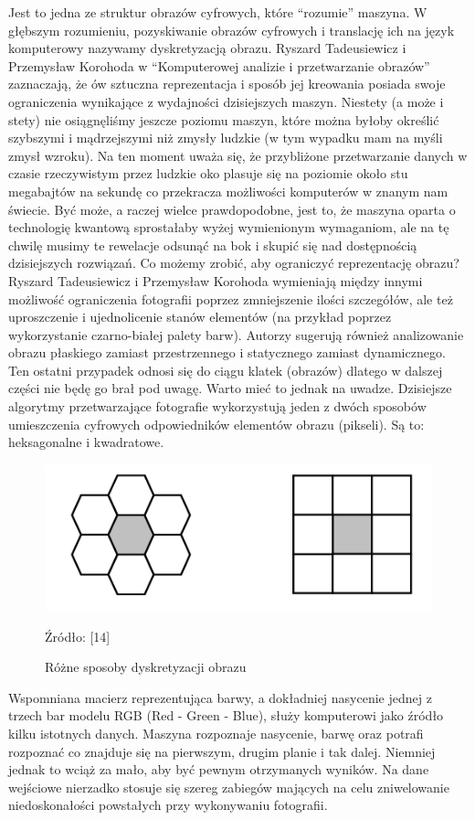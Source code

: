 \documentclass{article}
\begin{document}
	Jest to jedna ze struktur obrazów cyfrowych, które “rozumie” maszyna. W głębszym rozumieniu, pozyskiwanie obrazów cyfrowych i translację ich na język komputerowy nazywamy dyskretyzacją obrazu. Ryszard Tadeusiewicz i Przemysław Korohoda w “Komputerowej analizie i przetwarzanie obrazów” \cite{ref14} zaznaczają, że ów sztuczna reprezentacja i sposób jej kreowania posiada swoje ograniczenia wynikające z wydajności dzisiejszych maszyn. Niestety (a może i stety) nie osiągnęliśmy jeszcze poziomu maszyn, które można byłoby określić szybszymi i mądrzejszymi niż zmysły ludzkie (w tym wypadku mam na myśli zmysł wzroku). Na ten moment uważa się, że przybliżone przetwarzanie danych w czasie rzeczywistym przez ludzkie oko plasuje się na poziomie około stu megabajtów na sekundę co przekracza możliwości komputerów w znanym nam świecie. Być może, a raczej wielce prawdopodobne, jest to, że maszyna oparta o technologię kwantową sprostałaby wyżej wymienionym wymaganiom, ale na tę chwilę musimy te rewelacje odsunąć na bok i skupić się nad dostępnością dzisiejszych rozwiązań. Co możemy zrobić, aby ograniczyć reprezentację obrazu? Ryszard Tadeusiewicz i Przemysław Korohoda wymieniają między innymi możliwość ograniczenia fotografii poprzez zmniejszenie ilości szczegółów, ale też uproszczenie i ujednolicenie stanów elementów (na przykład poprzez wykorzystanie czarno-białej palety barw). Autorzy sugerują również analizowanie obrazu płaskiego zamiast przestrzennego i statycznego zamiast dynamicznego. Ten ostatni przypadek odnosi się do ciągu klatek (obrazów) dlatego w dalszej części nie będę go brał pod uwagę. Warto mieć to jednak na uwadze. Dzisiejsze algorytmy przetwarzające fotografie wykorzystują jeden z dwóch sposobów umieszczenia cyfrowych odpowiedników elementów obrazu (pikseli). Są to: heksagonalne i kwadratowe.
	\begin{figure}
		\centering
		\includegraphics[width=15cm]{dyskretyzacja}
		\caption{Różne sposoby dyskretyzacji obrazu}
		Źródło: [14]
	\end{figure}
	Wspomniana macierz reprezentująca barwy, a dokładniej nasycenie jednej z trzech bar modelu RGB (Red - Green - Blue), służy komputerowi jako źródło kilku istotnych danych. Maszyna rozpoznaje nasycenie, barwę oraz potrafi rozpoznać co znajduje się na pierwszym, drugim planie i tak dalej. Niemniej jednak to wciąż za mało, aby być pewnym otrzymanych wyników. Na dane wejściowe nierzadko stosuje się szereg zabiegów mających na celu zniwelowanie niedoskonałości powstałych przy wykonywaniu fotografii.
\end{document}
